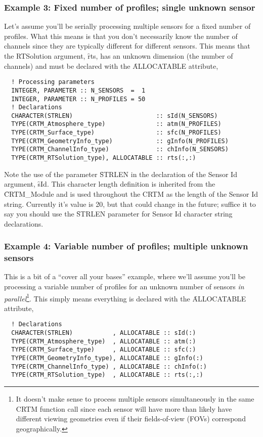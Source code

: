 \subsubsection{Example 3: Fixed number of profiles; single unknown sensor}
\label{sec:declare_ex_fpsus}
Let's assume you'll be serially processing multiple sensors for a fixed number of profiles. What this means is that you don't necessarily know the number of channels since they are typically different for different sensors. This means that the RTSolution argument, \f{rts}, has an unknown dimension (the number of channels) and must be declared with the \f{ALLOCATABLE} attribute,
\begin{ttfamily}
  \begin{verbatim}
  ! Processing parameters
  INTEGER, PARAMETER :: N_SENSORS  =  1
  INTEGER, PARAMETER :: N_PROFILES = 50
  ! Declarations
  CHARACTER(STRLEN)                       :: sId(N_SENSORS)
  TYPE(CRTM_Atmosphere_type)              :: atm(N_PROFILES)
  TYPE(CRTM_Surface_type)                 :: sfc(N_PROFILES)
  TYPE(CRTM_GeometryInfo_type)            :: gInfo(N_PROFILES)
  TYPE(CRTM_ChannelInfo_type)             :: chInfo(N_SENSORS)
  TYPE(CRTM_RTSolution_type), ALLOCATABLE :: rts(:,:)\end{verbatim}
\end{ttfamily}
Note the use of the parameter \f{STRLEN} in the declaration of the Sensor Id argument, \f{sId}. This character length definition is inherited from the \f{CRTM\_Module} and is used throughout the CRTM as the length of the Sensor Id string. Currently it's value is 20, but that could change in the future; suffice it to say you should use the \f{STRLEN} parameter for Sensor Id character string declarations. 

\subsubsection{Example 4: Variable number of profiles; multiple unknown sensors}
\label{sec:declare_ex_vpmus}
This is a bit of a ``cover all your bases'' example, where we'll assume you'll be processing a variable number of profiles for an unknown number of sensors \textit{in parallel}\footnote{It doesn't make sense to process multiple sensors simultaneously in the same CRTM function call since each sensor will have more than likely have different viewing geometries even if their fields-of-view (FOVs) correspond geographically.}. This simply means everything is declared with the \f{ALLOCATABLE} attribute,
\begin{ttfamily}
  \begin{verbatim}
  ! Declarations
  CHARACTER(STRLEN)           , ALLOCATABLE :: sId(:)
  TYPE(CRTM_Atmosphere_type)  , ALLOCATABLE :: atm(:)
  TYPE(CRTM_Surface_type)     , ALLOCATABLE :: sfc(:)
  TYPE(CRTM_GeometryInfo_type), ALLOCATABLE :: gInfo(:)  
  TYPE(CRTM_ChannelInfo_type) , ALLOCATABLE :: chInfo(:)
  TYPE(CRTM_RTSolution_type)  , ALLOCATABLE :: rts(:,:)\end{verbatim}
\end{ttfamily}


